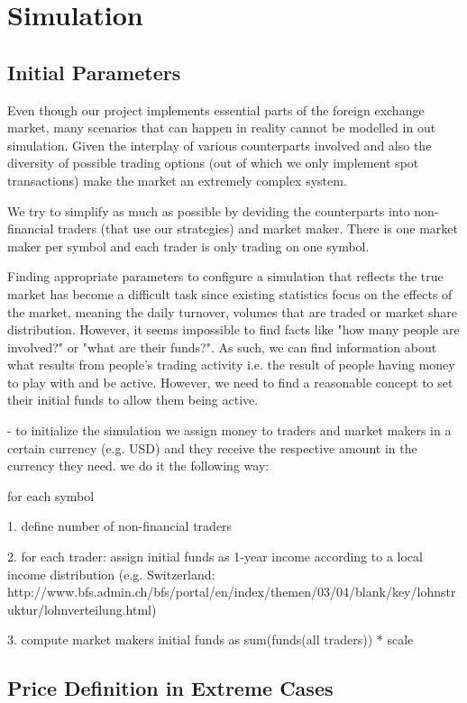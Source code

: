 \section{Simulation}

\subsection{Initial Parameters}
Even though our project implements essential parts of the foreign exchange 
market, many scenarios that can happen in reality cannot be modelled in out 
simulation. Given the interplay of various counterparts involved and also the
diversity of possible trading options (out of which we only implement spot transactions) make the  market an extremely complex system.

We try to simplify as much as possible by deviding the counterparts into
non-financial traders (that use our strategies) and market maker. There is 
one market maker per symbol and each trader is only trading on one symbol. 

Finding appropriate parameters to configure a simulation that reflects the
true market has become a difficult task since existing statistics focus on 
the effects of the market, meaning the daily turnover, volumes that are
traded or market share distribution. However, it seems impossible to find 
facts like "how many people are involved?" or "what are their funds?".
As such, we can find information about what results from people's trading 
activity i.e. the result of people having money to play with and be active.
However, we need to find a reasonable concept to set their initial funds to allow them being active.

- to initialize the simulation we assign money to traders and market makers in a certain currency (e.g. USD) and they receive the respective amount in the currency they need. we do it the following way:

for each symbol

1. define number of non-financial traders

2. for each trader: assign initial funds as 1-year income according to a local income distribution (e.g. Switzerland: http://www.bfs.admin.ch/bfs/portal/en/index/themen/03/04/blank/key/lohnstruktur/lohnverteilung.html)

3. compute market makers initial funds as sum(funds(all traders)) * scale

\subsection{Price Definition in Extreme Cases}

